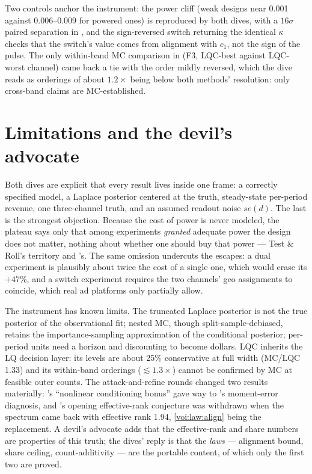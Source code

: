 Two controls anchor the instrument: the power cliff (weak designs near 0.001 against 0.006--0.009 for powered ones) is reproduced by both dives, with a $16\sigma$ paired separation in , and the sign-reversed switch returning the identical $\kappa$ checks that the switch's value comes from alignment with $c_1$, not the sign of the pulse. The only within-band MC comparison in  (F3, LQC-best against LQC-worst channel) came back a tie with the order mildly reversed, which the dive reads as orderings of about $1.2\times$ being below both methods' resolution: only cross-band claims are MC-established.

\section{Limitations and the devil's advocate}

Both dives are explicit that every result lives inside one frame: a correctly specified model, a Laplace posterior centered at the truth, steady-state per-period revenue, one three-channel truth, and an assumed readout noise $se(d)$. The last is the strongest objection. Because the cost of power is never modeled, the plateau says only that among experiments \emph{granted} adequate power the design does not matter, nothing about whether one should buy that power --- Test \& Roll's territory and 's. The same omission undercuts the escapes: a dual experiment is plausibly about twice the cost of a single one, which would erase its $+47\%$, and a switch experiment requires the two channels' geo assignments to coincide, which real ad platforms only partially allow.

The instrument has known limits. The truncated Laplace posterior is not the true posterior of the observational fit; nested MC, though split-sample-debiased, retains the importance-sampling approximation of the conditional posterior; per-period units need a horizon and discounting to become dollars. LQC inherits the LQ decision layer: its levels are about 25\% conservative at full width (MC/LQC 1.33) and its within-band orderings ($\lesssim 1.3\times$) cannot be confirmed by MC at feasible outer counts. The attack-and-refine rounds changed two results materially: 's ``nonlinear conditioning bonus'' gave way to 's moment-error diagnosis, and 's opening effective-rank conjecture was withdrawn when the spectrum came back with effective rank 1.94, \cref{voi:law:align} being the replacement. A devil's advocate adds that the effective-rank and share numbers are properties of this truth; the dives' reply is that the \emph{laws} --- alignment bound, share ceiling, count-additivity --- are the portable content, of which only the first two are proved.

